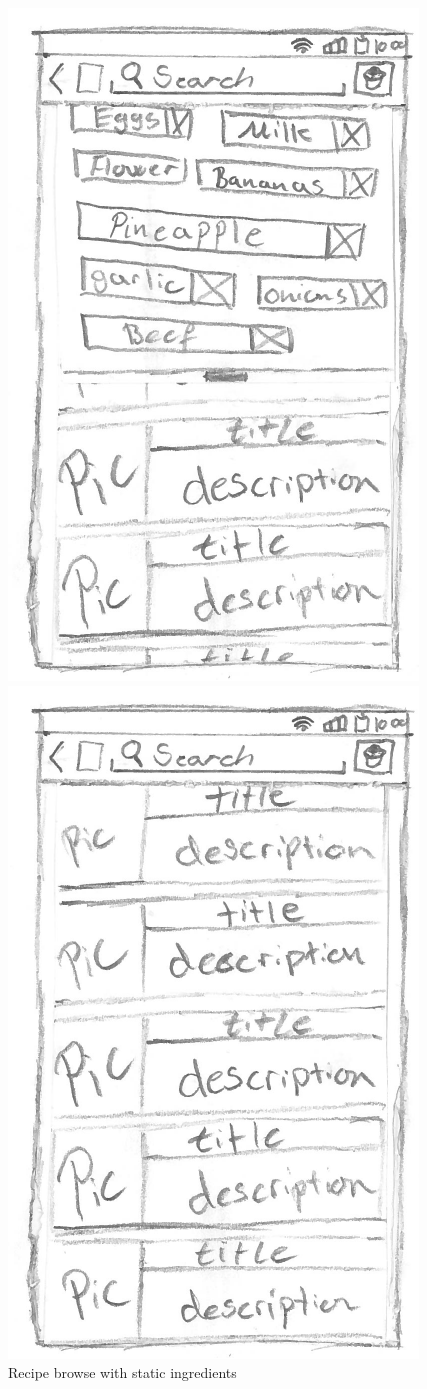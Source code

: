\begin{figure}[H]
\begin{minipage}[b]{0.5\columnwidth}
\centering
\includegraphics[width=0.7\columnwidth]{img/prototypes/recipe_browse2.pdf}
\caption{Recipe browse with static ingredients\label{fig:recipestatic}}
\end{minipage}
\hspace{0.5cm}
\begin{minipage}[b]{0.5\columnwidth}
\centering
\includegraphics[width=0.7\columnwidth]{img/prototypes/recipe_browse3.pdf}

\end{minipage}
\end{figure}
